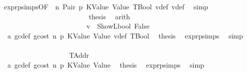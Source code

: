 \begin{isabellebody}
\ expr{\isachardot}{\kern0pt}psimps{\isacharparenleft}{\kern0pt}{}{}{\isacharparenright}{\kern0pt}{\isacharbrackleft}{\kern0pt}OF\ {}{}{\isacharparenleft}{\kern0pt}{}{\isacharparenright}{\kern0pt}{\isacharbrackright}{\kern0pt}\ n\ Pair\ p{}\ KValue\ Value\ TBool\ v{\isacharunderscore}{\kern0pt}def\ v{\isacharunderscore}{\kern0pt}def{}\ \isamarkupfalse%
\ simp\isanewline
\ \ \ \ \ \ \ \ \ \ \ \ \ \ \ \ \ \ \ \ \ \ \isamarkupfalse%
\ \isamarkupfalse%
\ {\isacharquery}{\kern0pt}thesis\ \isamarkupfalse%
\ arith\isanewline
\ \ \ \ \ \ \ \ \ \ \ \ \ \ \ \ \ \ \ \ \isamarkupfalse%
\isanewline
\ \ \ \ \ \ \ \ \ \ \ \ \ \ \ \ \ \ \ \ \ \ \isamarkupfalse%
\ {\isachardoublequoteopen}{\isasymnot}\ v\ {\isacharequal}{\kern0pt}\ ShowL\isactrlsub b\isactrlsub o\isactrlsub o\isactrlsub l\ False{\isachardoublequoteclose}\isanewline
\ \ \ \ \ \ \ \ \ \ \ \ \ \ \ \ \ \ \ \ \ \ \isamarkupfalse%
\ {}{}{\isacharparenleft}{\kern0pt}{}{\isacharparenright}{\kern0pt}\ a{}\ gc{\isacharunderscore}{\kern0pt}def\ gcost\ n\ p{}\ KValue\ Value\ v{\isacharunderscore}{\kern0pt}def\ TBool\ \isamarkupfalse%
\ {\isacharquery}{\kern0pt}thesis\ \isamarkupfalse%
\ expr{\isachardot}{\kern0pt}psimps{\isacharparenleft}{\kern0pt}{}{}{\isacharparenright}{\kern0pt}\ \isamarkupfalse%
\ simp\isanewline
\ \ \ \ \ \ \ \ \ \ \ \ \ \ \ \ \ \ \ \ \isamarkupfalse%
\isanewline
\ \ \ \ \ \ \ \ \ \ \ \ \ \ \ \ \ \ \isamarkupfalse%
\isanewline
\ \ \ \ \ \ \ \ \ \ \ \ \ \ \ \ \isamarkupfalse%
\isanewline
\ \ \ \ \ \ \ \ \ \ \ \ \ \ \ \ \ \ \isamarkupfalse%
\ TAddr\isanewline
\ \ \ \ \ \ \ \ \ \ \ \ \ \ \ \ \ \ \isamarkupfalse%
\ {}{}{\isacharparenleft}{\kern0pt}{}{\isacharparenright}{\kern0pt}\ a{}\ gc{\isacharunderscore}{\kern0pt}def\ gcost\ n\ p{}\ KValue\ Value\ \isamarkupfalse%
\ {\isacharquery}{\kern0pt}thesis\ \isamarkupfalse%
\ expr{\isachardot}{\kern0pt}psimps{\isacharparenleft}{\kern0pt}{}{}{\isacharparenright}{\kern0pt}\ \isamarkupfalse%
\ simp\isanewline
\ \ \ \ \ \ \ \ \ \ \ \ \ \ \ \ \isamarkupfalse%
\isanewline
\ \ \ \ \ \ \ \ \ \ \ \ \ \ \isamarkupfalse%

\end{isabellebody}
